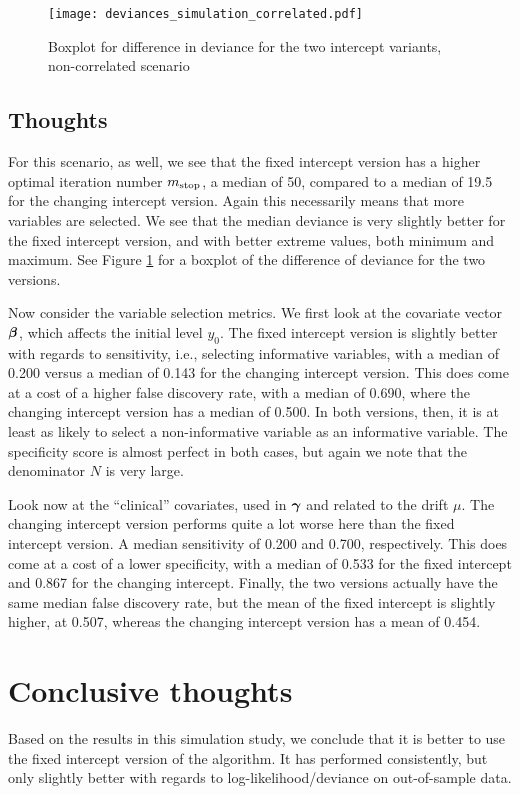 \begin{figure}
\caption{Boxplot for difference in deviance for the two intercept variants, non-correlated scenario}
\label{fig:simulation-not-correlated-deviances-boxplot}
\centering\texttt{[image: deviances\_simulation\_correlated.pdf]}
\end{figure}


\subsection{Thoughts}
For this scenario, as well, we see that the fixed intercept version has a higher optimal iteration number $m_{\text{stop}}$, a median of 50, compared to a median of 19.5 for the changing intercept version.
Again this necessarily means that more variables are selected.
We see that the median deviance is very slightly better for the fixed intercept version, and with better extreme values, both minimum and maximum.
See Figure \ref{fig:simulation-not-correlated-deviances-boxplot} for a boxplot of the difference of deviance for the two versions.

Now consider the variable selection metrics.
We first look at the covariate vector $\boldsymbol{\beta}$, which affects the initial level $y_0$.
The fixed intercept version is slightly better with regards to sensitivity, i.e., selecting informative variables, with a median of 0.200 versus a median of 0.143 for the changing intercept version.
This does come at a cost of a higher false discovery rate, with a median of 0.690, where the changing intercept version has a median of 0.500.
In both versions, then, it is at least as likely to select a non-informative variable as an informative variable.
The specificity score is almost perfect in both cases, but again we note that the denominator $N$ is very large.

Look now at the ``clinical'' covariates, used in $\boldsymbol{\gamma}$ and related to the drift $\mu$.
The changing intercept version performs quite a lot worse here than the fixed intercept version.
A median sensitivity of 0.200 and 0.700, respectively.
This does come at a cost of a lower specificity, with a median of 0.533 for the fixed intercept and 0.867 for the changing intercept.
Finally, the two versions actually have the same median false discovery rate, but the mean of the fixed intercept is slightly higher, at 0.507, whereas the changing intercept version has a mean of 0.454.

\section{Conclusive thoughts}
Based on the results in this simulation study, we conclude that it is better to use the fixed intercept version of the algorithm.
It has performed consistently, but only slightly better with regards to log-likelihood/deviance on out-of-sample data.
